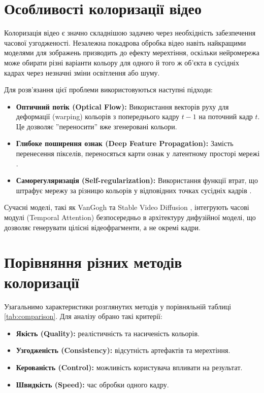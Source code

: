 \section{Особливості колоризації відео}

    Колоризація відео є значно складнішою задачею через необхідність забезпечення часової узгодженості.
    Незалежна покадрова обробка відео навіть найкращими моделями для зображень призводить до ефекту мерехтіння, оскільки нейромережа може обирати різні варіанти кольору для одного й того ж об'єкта в сусідніх кадрах через незначні зміни освітлення або шуму.

    Для розв'язання цієї проблеми використовуються наступні підходи:
    \begin{itemize}[label=$\bullet$]
        \item \textbf{Оптичний потік (Optical Flow):} Використання векторів руху для деформації (warping) кольорів з попереднього кадру $t-1$ на поточний кадр $t$.
            Це дозволяє ''переносити'' вже згенеровані кольори.
        \item \textbf{Глибоке поширення ознак (Deep Feature Propagation):} Замість перенесення пікселів, переносяться карти ознак у латентному просторі мережі \cite{2024-temporally-consistent-video-colorization}.
        \item \textbf{Саморегуляризація (Self-regularization):} Використання функції втрат, що штрафує мережу за різницю кольорів у відповідних точках сусідніх кадрів \cite{2019-fully-automatic-video-colorization}.
    \end{itemize}

    Сучасні моделі, такі як VanGogh \cite{2025-vangogh} та Stable Video Diffusion \cite{2023-stable-video-diffusion}, інтегрують часові модулі (Temporal Attention) безпосередньо в архітектуру дифузійної моделі, що дозволяє генерувати цілісні відеофрагменти, а не окремі кадри.

\section{Порівняння різних методів колоризації}
    Узагальнимо характеристики розглянутих методів у порівняльній таблиці \ref{tab:comparison}.
    Для аналізу обрано такі критерії:
    \begin{itemize}[label=$\bullet$]
        \item \textbf{Якість (Quality):} реалістичність та насиченість кольорів.
        \item \textbf{Узгодженість (Consistency):} відсутність артефактів та мерехтіння.
        \item \textbf{Керованість (Control):} можливість користувача впливати на результат.
        \item \textbf{Швидкість (Speed):} час обробки одного кадру.
    \end{itemize}

